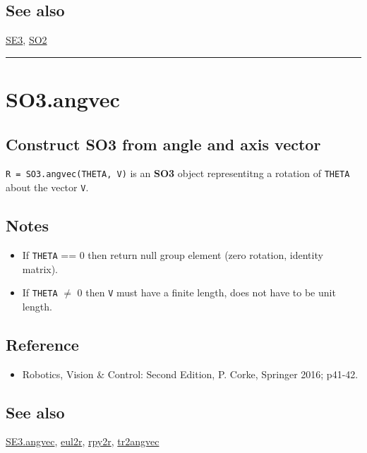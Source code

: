 \subsection*{See also}


\hyperlink{SE3}{\color{blue} SE3}, \hyperlink{SO2}{\color{blue} SO2}

\vspace{1.5ex}\hrule

\hypertarget{SO3.angvec}{\section*{SO3.angvec}}
\subsection*{Construct SO3 from angle and axis vector}


\texttt{R = SO3.angvec(THETA, V)} is an \textbf{\color{red} SO3} object representitng a rotation
of \texttt{THETA} about the vector \texttt{V}.


\subsection*{Notes}
\begin{itemize}
  \item If \texttt{THETA} == 0 then return null group element (zero rotation, identity matrix).
  \item If \texttt{THETA} $\ne$ 0 then \texttt{V} must have a finite length, does not have to be unit length.
\end{itemize}

\subsection*{Reference}
\begin{itemize}
  \item Robotics, Vision \& Control: Second Edition, P. Corke, Springer 2016; p41-42.
\end{itemize}

\subsection*{See also}


\hyperlink{SE3.angvec}{\color{blue} SE3.angvec}, \hyperlink{eul2r}{\color{blue} eul2r}, \hyperlink{rpy2r}{\color{blue} rpy2r}, \hyperlink{tr2angvec}{\color{blue} tr2angvec}

